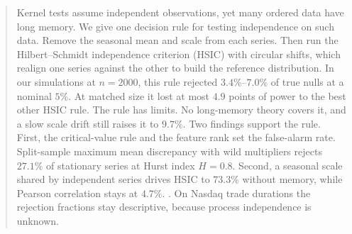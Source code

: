 \begin{abstract}
Kernel tests assume independent observations, yet many ordered data have long memory. We give one decision rule for testing independence on such data. Remove the seasonal mean and scale from each series. Then run the Hilbert--Schmidt independence criterion (HSIC) with circular shifts, which realign one series against the other to build the reference distribution. In our simulations at $n=2000$, this rule rejected $3.4\%$--$7.0\%$ of true nulls at a nominal $5\%$. At matched size it lost at most $4.9$ points of power to the best other HSIC rule. The rule has limits. No long-memory theory covers it, and a slow scale drift still raises it to $9.7\%$. Two findings support the rule. First, the critical-value rule and the feature rank set the false-alarm rate. Split-sample maximum mean discrepancy with wild multipliers rejects $27.1\%$ of stationary series at Hurst index $H=0.8$. Second, a seasonal scale shared by independent series drives HSIC to $73.3\%$ without memory, while Pearson correlation stays at $4.7\%$. . On Nasdaq trade durations the rejection fractions stay descriptive, because process independence is unknown.
\end{abstract}
